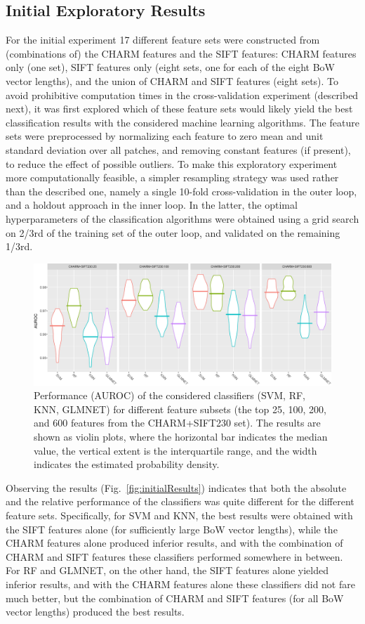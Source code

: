 \subsection{Initial Exploratory Results}
\label{subsec:initialExploratoryExperiments}
For the initial experiment 17 different feature sets were constructed from (combinations of) the CHARM features and the SIFT features: CHARM features only (one set), SIFT features only (eight sets, one for each of the eight BoW vector lengths), and the union of CHARM and SIFT features (eight sets). To avoid prohibitive computation times in the cross-validation experiment (described next), it was first explored which of these feature sets would likely yield the best classification results with the considered machine learning algorithms. The feature sets were preprocessed by normalizing each feature to zero mean and unit standard deviation over all patches, and removing constant features (if present), to reduce the effect of possible outliers. To make this exploratory experiment more computationally feasible, a simpler resampling strategy was used rather than the described one, namely a single 10-fold cross-validation in the outer loop, and a holdout approach in the inner loop. In the latter, the optimal hyperparameters of the classification algorithms were obtained using a grid search on 2/3rd of the training set of the outer loop, and validated on the remaining 1/3rd.
\begin{figure}[ht]
	\centering
	\includegraphics[width=\textwidth]{fig06}
	\caption{Performance (AUROC) of the considered classifiers (SVM, RF, KNN, GLMNET) for different feature subsets (the top 25, 100, 200, and 600 features from the CHARM+SIFT230 set). The results are shown as violin plots, where the horizontal bar indicates the median value, the vertical extent is the interquartile range, and the width indicates the estimated probability density.}
	\label{fig:subsetResults}
\end{figure}
Observing the results (Fig.~\ref{fig:initialResults}) indicates that both the absolute and the relative performance of the classifiers was quite different for the different feature sets. Specifically, for SVM and KNN, the best results were obtained with the SIFT features alone (for sufficiently large BoW vector lengths), while the CHARM features alone produced inferior results, and with the combination of CHARM and SIFT features these classifiers performed somewhere in between. For RF and GLMNET, on the other hand, the SIFT features alone yielded inferior results, and with the CHARM features alone these classifiers did not fare much better, but the combination of CHARM and SIFT features (for all BoW vector lengths) produced the best results.


